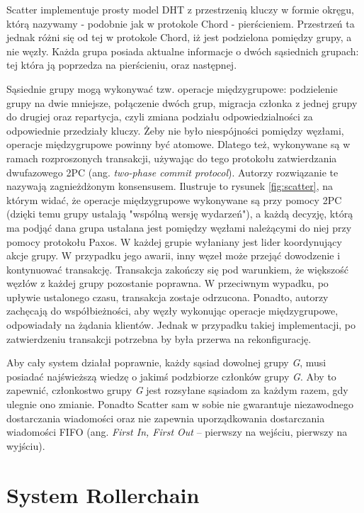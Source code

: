 \documentclass[12pt, twoside, openany]{report}
\begin{document}
Scatter implementuje prosty model DHT z przestrzenią kluczy w formie okręgu, którą nazywamy - podobnie jak w protokole Chord - pierścieniem. Przestrzeń ta jednak różni się od tej w protokole Chord, iż jest podzielona pomiędzy grupy, a nie węzły. Każda grupa posiada aktualne informacje o dwóch sąsiednich grupach: tej która ją poprzedza na pierścieniu, oraz następnej.

Sąsiednie grupy mogą wykonywać tzw. operacje międzygrupowe: podzielenie grupy na dwie mniejsze, połączenie dwóch grup, migracja członka z jednej grupy do drugiej oraz repartycja, czyli zmiana podziału odpowiedzialności za odpowiednie przedziały kluczy. Żeby nie było niespójności pomiędzy węzłami, operacje międzygrupowe powinny być atomowe. Dlatego też, wykonywane są w ramach rozproszonych transakcji, używając do tego protokołu zatwierdzania dwufazowego 2PC (ang. \textit{two-phase commit protocol}). Autorzy rozwiązanie te nazywają zagnieżdżonym konsensusem. Ilustruje to rysunek \ref{fig:scatter}, na którym widać, że operacje międzygrupowe wykonywane są przy pomocy 2PC (dzięki temu grupy ustalają "wspólną wersję wydarzeń"), a każdą decyzję, którą ma podjąć dana grupa ustalana jest pomiędzy węzłami należącymi do niej przy pomocy protokołu Paxos. W każdej grupie wyłaniany jest lider koordynujący akcje grupy. W przypadku jego awarii, inny węzeł może przejąć dowodzenie i kontynuować transakcję. Transakcja zakończy się pod warunkiem, że większość węzłów z każdej grupy pozostanie poprawna. W przeciwnym wypadku, po upływie ustalonego czasu, transakcja zostaje odrzucona. Ponadto, autorzy zachęcają do współbieżności, aby węzły wykonując operacje międzygrupowe, odpowiadały na żądania klientów. Jednak w przypadku takiej implementacji, po zatwierdzeniu transakcji potrzebna by była przerwa na rekonfigurację.

Aby cały system działał poprawnie, każdy sąsiad dowolnej grupy \textit{G}, musi posiadać najświeższą wiedzę o jakimś podzbiorze członków grupy \textit{G}. Aby to zapewnić, członkostwo grupy \textit{G} jest rozsyłane sąsiadom za każdym razem, gdy ulegnie ono zmianie. Ponadto Scatter sam w sobie nie gwarantuje niezawodnego dostarczania wiadomości oraz nie zapewnia uporządkowania dostarczania wiadomości FIFO (ang. \textit{First In, First Out} – pierwszy na wejściu, pierwszy na wyjściu).

\section{System Rollerchain}
\label{subch_rollerchain}
\end{document}
